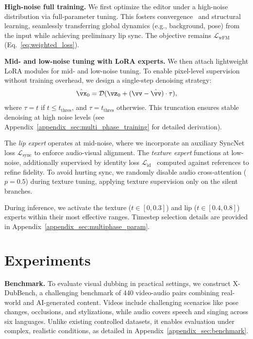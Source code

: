 \documentclass{article}
\newcommand{\benchname}{X-DubBench}
\newcommand{\myparagraph}[1]{\noindent\textbf{#1}}
\theoremstyle{plain}
\theoremstyle{definition}
\theoremstyle{remark}
\begin{document}
\myparagraph{High-noise full training.} 
We first optimize the editor under a high-noise distribution via full-parameter tuning. 
This fosters convergence~\citep{esser2024sd3} and structural learning, seamlessly transferring global dynamics (e.g., background, pose) from the input while achieving preliminary lip sync. 
The objective remains $\mathcal{L}_{\text{wFM}}$ (Eq.~\ref{eq:weighted_loss}).


\myparagraph{Mid- and low-noise tuning with LoRA experts.} 
We then attach lightweight LoRA modules for mid- and low-noise tuning. 
To enable pixel-level supervision without training overhead, we design a single-step denoising strategy:
\begin{equation}
\hat{\vx}_0 = \mathcal{D}(\vz_0 + (\vv - \hat{\vv}) \cdot \tau),
\label{eq:single_step_denoising}
\end{equation}
where $\tau = t$ if $t \le t_{\text{thres}}$, and $\tau = t_{\text{thres}}$ otherwise. This truncation ensures stable denoising at high noise levels (see Appendix~\ref{appendix_sec:multi_phase_training} for detailed derivation).


The \emph{lip expert} operates at mid-noise, where we incorporate an auxiliary SyncNet loss $\mathcal{L}_{\text{sync}}$ to enforce audio-visual alignment. 
The \emph{texture expert} functions at low-noise, additionally supervised by identity loss $\mathcal{L}_{\text{id}}$~\citep{deng2019arcface,radford2021clip} computed
against references to refine fidelity. 
To avoid hurting sync, we randomly disable audio cross-attention ($p=0.5$) during texture tuning, applying texture supervision only on the silent branches.

During inference, we activate the texture ($t \in [0, 0.3]$) and lip ($t \in [0.4, 0.8]$) experts within their most effective ranges. 
Timestep selection details are provided in Appendix~\ref{appendix_sec:multiphase_param}.

\section{Experiments}
\label{sec:exp}
\myparagraph{Benchmark.}
To evaluate visual dubbing in practical settings, we construct \benchname{}, a challenging benchmark of 440 video-audio pairs combining real-world and AI-generated content.
Videos include challenging scenarios like pose changes, occlusions, and stylizations, while audio covers speech and singing across six languages.
Unlike existing controlled datasets, it enables evaluation under complex, realistic conditions, as detailed in Appendix~\ref{appendix_sec:benchmark}.
\end{document}
